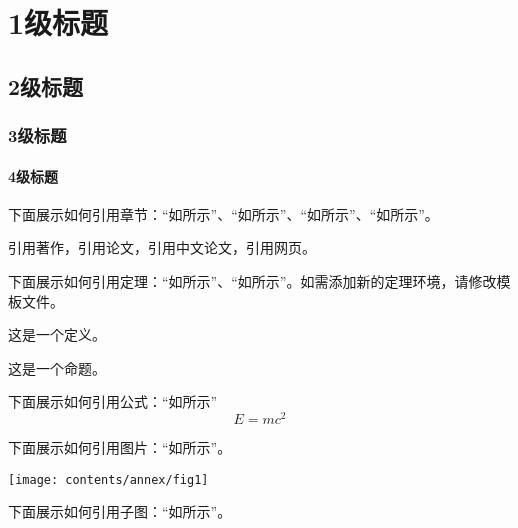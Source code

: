\chapter{1级标题}\label{cha_one}
\section{2级标题}\label{sec_two}
\subsection{3级标题}\label{subsec_three}
\subsubsection{4级标题}\label{subsubsec_four}

下面展示如何引用章节：“如所示”、“如所示”、“如所示”、“如所示”。

引用著作，引用论文，引用中文论文，引用网页。

下面展示如何引用定理：“如所示”、“如所示”。如需添加新的定理环境，请修改模板文件。
\begin{defn}\label{def_1}
	这是一个定义。
\end{defn}
\begin{prop}\label{prop_2}
	这是一个命题。
\end{prop}

下面展示如何引用公式：“如所示”
\begin{equation}\label{eq_emc}
	E=mc^2
\end{equation}

下面展示如何引用图片：“如所示”。

\begin{bjtufigure}
\texttt{[image: contents/annex/fig1]}
	\label{fig_label_2}
\end{bjtufigure}

下面展示如何引用子图：“如所示”。

\begin{bjtufigure}
	\label{fig_label}
\end{bjtufigure}



